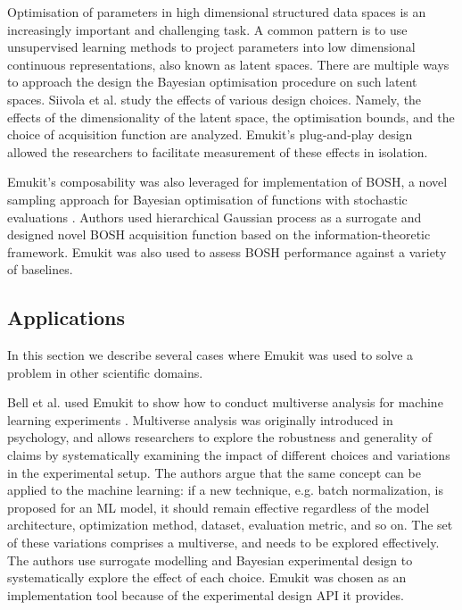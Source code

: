 Optimisation of parameters in high dimensional structured data spaces is an increasingly important and challenging task. A common pattern is to use unsupervised learning methods to project parameters into low dimensional continuous representations, also known as latent spaces. There are multiple ways to approach the design the Bayesian optimisation procedure on such latent spaces. Siivola et al. \cite{siivola2021good} study the effects of various design choices. Namely, the effects of the dimensionality of the latent space, the optimisation bounds, and the choice of acquisition function are analyzed. Emukit's plug-and-play design allowed the researchers to facilitate measurement of these effects in isolation.

Emukit's composability was also leveraged for implementation of BOSH, a novel sampling approach for Bayesian optimisation of functions with stochastic evaluations \cite{moss2020bosh}. Authors used hierarchical Gaussian process as a surrogate and designed novel BOSH acquisition function based on the information-theoretic framework. Emukit was also used to assess BOSH performance against a variety of baselines.


\subsection{Applications}
In this section we describe several cases where Emukit was used to solve a problem in other scientific domains.

Bell et al. used Emukit to show how to conduct multiverse analysis for machine learning experiments \cite{bell2022modeling}. Multiverse analysis was originally introduced in psychology, and allows researchers to explore the robustness and generality of claims by systematically examining the impact of different choices and variations in the experimental setup. The authors argue that the same concept can be applied to the machine learning: if a new technique, e.g. batch normalization, is proposed for an ML model, it should remain effective regardless of the model architecture, optimization method, dataset, evaluation metric, and so on. The set of these variations comprises a multiverse, and needs to be explored effectively. The authors use surrogate modelling and Bayesian experimental design to systematically explore the effect of each choice. Emukit was chosen as an implementation tool because of the experimental design API it provides.

